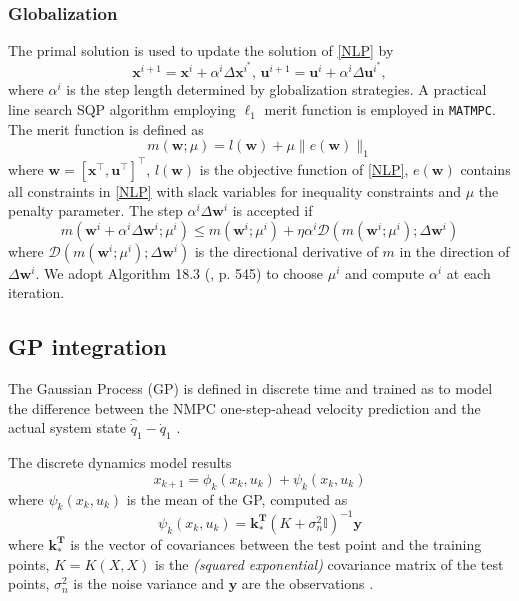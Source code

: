 \documentclass{article}
\newcommand{\software}[1]{{\tt#1}}
\newcommand{\norm}[1]{\lVert#1\rVert}
\begin{document}
\subsubsection{Globalization}
The primal solution is used to update the solution of \eqref{NLP} by
\begin{equation}\label{solution update}
\mathbf{x}^{i+1} = \mathbf{x}^{i} + \alpha^i \Delta\mathbf{x}^{i^*}, \, \mathbf{u}^{i+1} = \mathbf{u}^{i} + \alpha^i \Delta\mathbf{u}^{i^*},
\end{equation}
where $\alpha^i$ is the step length determined by globalization strategies. A practical line search SQP algorithm employing $\ell_1$ merit function \cite{nocedal2006numerical} is employed in \software{MATMPC}. The merit function is defined as
\begin{equation}
m(\mathbf{w};\mu)=l(\mathbf{w})+\mu\norm{e(\mathbf{w})}_1
\end{equation}
where $\mathbf{w}=[\mathbf{x}^\top,\mathbf{u}^\top]^\top$, $l(\mathbf{w})$ is the objective function of \eqref{NLP}, $e(\mathbf{w})$ contains all constraints in \eqref{NLP} with slack variables for inequality constraints and $\mu$ the penalty parameter. The step $\alpha^i\Delta \mathbf{w}^i$ is accepted if 
\begin{equation}
m(\mathbf{w}^i+\alpha^i\Delta \mathbf{w}^i;\mu^i)\leq m(\mathbf{w}^i;\mu^i)+\eta\alpha^i\mathcal{D}(m(\mathbf{w}^i;\mu^i);\Delta \mathbf{w}^i)
\end{equation}
where $\mathcal{D}(m(\mathbf{w}^i;\mu^i);\Delta \mathbf{w}^i)$ is the directional derivative of $m$ in the direction of $\Delta \mathbf{w}^i$. We adopt Algorithm 18.3 (\cite{nocedal2006numerical}, p. 545) to choose $\mu^i$ and compute $\alpha^i$ at each iteration.

\subsection{GP integration}

The Gaussian Process (GP) is defined in discrete time and trained as to model the difference between the NMPC one-step-ahead velocity prediction and the actual system state $\hat{\dot{q}}_1 - \dot{q}_1$ \cite{picotti2021lbmatmpc}.

The discrete dynamics model results
\begin{equation}
    x_{k+1} = \phi_k(x_k,u_k) + \psi_k(x_k,u_k)
\end{equation}
where $\psi_k(x_k,u_k)$ is the mean of the GP, computed as
\begin{equation}
    \psi_k(x_k,u_k) = \mathbf{k_*^T} (K+\sigma_n^2 \mathbb{I})^{-1} \mathbf{y}
\end{equation}
where $\mathbf{k_*^T}$ is the vector of covariances between the test point and the training points, $K = K(X,X)$ is the \textit{(squared exponential)} covariance matrix of the test points, $\sigma_n^2$ is the noise variance and $\mathbf{y}$ are the observations \cite[p. 17]{rasmussen2003gaussian}.
\end{document}
